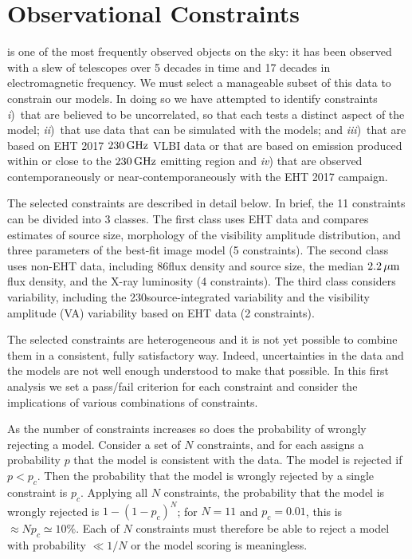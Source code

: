 \section{Observational Constraints}\label{sec:observations}

\sgra is one of the most frequently observed objects on the sky: it has been observed with a slew of telescopes over 5 decades in time and 17 decades in electromagnetic frequency.
We must select a manageable subset of this data to constrain our models.
In doing so we have attempted to identify constraints 
\emph{i})~that are believed to be uncorrelated, so that each tests a distinct aspect of the model;
\emph{ii})~that use data that can be simulated with the models; and
\emph{iii})~that are based on EHT 2017 $230\,\mathrm{GHz}$ VLBI data or that are based on emission produced within or close to the $230\,\mathrm{GHz}$ emitting region and \emph{iv})
that are observed contemporaneously or near-contemporaneously with the EHT 2017 campaign.

The selected constraints are described in detail below.
In brief, the 11 constraints can be divided into 3 classes.
The first class uses EHT data and compares estimates of source size, morphology of the visibility amplitude distribution, and three parameters of the best-fit \mring image model (5 constraints).
The second class uses non-EHT data, including 86\GHz flux density and source size, the median $2.2\,\mu\mathrm{m}$ flux density, and the X-ray luminosity (4 constraints).
The third class considers variability, including the 230\GHz source-integrated variability and the visibility amplitude (VA) variability based on EHT data (2 constraints).

The selected constraints are heterogeneous and it is not yet possible to combine them in a consistent, fully satisfactory way.
Indeed, uncertainties in the data and the models are not well enough understood to make that possible.
In this first analysis we set a pass/fail criterion for each constraint and consider the implications of various combinations of constraints.

As the number of constraints increases so does the probability of wrongly rejecting a model.
Consider a set of $N$ constraints, and for each assigns a probability $p$ that the model is consistent with the data.
The model is rejected if $p < p_c$.
Then the probability that the model is wrongly rejected by a single constraint is $p_c$.
Applying all $N$ constraints, the probability that the model is wrongly rejected is $1 - (1 - p_c)^N$; for $N = 11$ and $p_c = 0.01$, this is $\approx N p_c \simeq 10\%$.
Each of $N$ constraints must therefore be able to reject a model with probability $\ll 1/N$ or the model scoring is meaningless.

